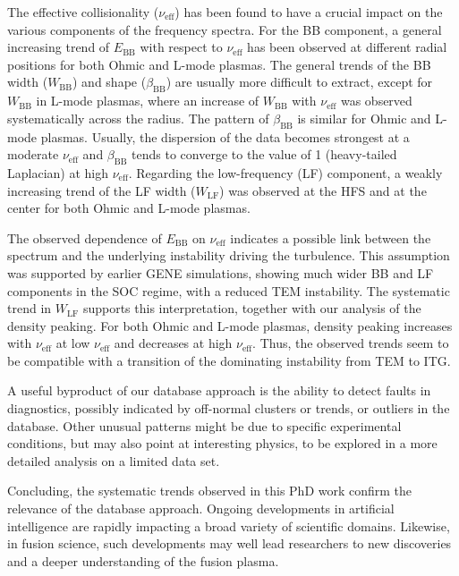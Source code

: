 The effective collisionality ($\nu_\mathrm{eff}$) has been found to have a crucial impact on the various components of the frequency spectra. For the BB component, a general increasing trend of $E_\mathrm{BB}$ with respect to $\nu_\mathrm{eff}$ has been observed at different radial positions for both Ohmic and L-mode plasmas. The general trends of the BB width ($W_\mathrm{BB}$) and shape ($\beta_\mathrm{BB}$) are usually more difficult to extract, except for $W_\mathrm{BB}$ in L-mode plasmas, where an increase of $W_\mathrm{BB}$ with $\nu_\mathrm{eff}$ was observed systematically across the radius. The pattern of $\beta_\mathrm{BB}$ is similar for Ohmic and L-mode plasmas. Usually, the dispersion of the data becomes strongest at a moderate $\nu_\mathrm{eff}$ and $\beta_\mathrm{BB}$ tends to converge to the value of 1 (heavy-tailed Laplacian) at high $\nu_\mathrm{eff}$. Regarding the low-frequency (LF) component, a weakly increasing trend of the LF width ($W_\mathrm{LF}$) was observed at the HFS and at the center for both Ohmic and L-mode plasmas.

The observed dependence of $E_\mathrm{BB}$ on $\nu_\mathrm{eff}$ indicates a possible link between the spectrum and the underlying instability driving the turbulence. This assumption was supported by earlier GENE simulations, showing much wider BB and LF components in the SOC regime, with a reduced TEM instability. The systematic trend in $W_\mathrm{LF}$ supports this interpretation, together with our analysis of the density peaking. For both Ohmic and L-mode plasmas, density peaking increases with $\nu_\mathrm{eff}$ at low $\nu_\mathrm{eff}$ and decreases at high $\nu_\mathrm{eff}$. Thus, the observed trends seem to be compatible with a transition of the dominating instability from TEM to ITG.

A useful byproduct of our database approach is the ability to detect faults in diagnostics, possibly indicated by off-normal clusters or trends, or outliers in the database. Other unusual patterns might be due to specific experimental conditions, but may also point at interesting physics, to be explored in a more detailed analysis on a limited data set.

Concluding, the systematic trends observed in this PhD work confirm the relevance of the database approach. Ongoing developments in artificial intelligence are rapidly impacting a broad variety of scientific domains. Likewise, in fusion science, such developments may well lead researchers to new discoveries and a deeper understanding of the fusion plasma.


